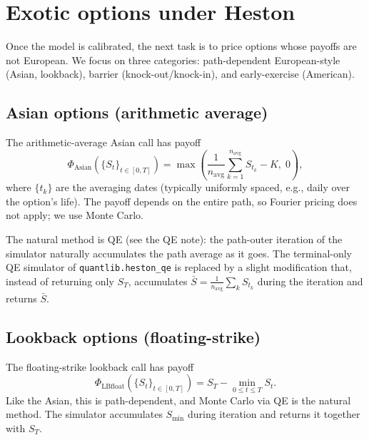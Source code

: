 \documentclass[11pt]{article}
\theoremstyle{plain}
\theoremstyle{definition}
\theoremstyle{remark}
\begin{document}
\section{Exotic options under Heston}

Once the model is calibrated, the next task is to price options whose payoffs are not European. We focus on three categories: path-dependent European-style (Asian, lookback), barrier (knock-out/knock-in), and early-exercise (American).

\subsection{Asian options (arithmetic average)}

The arithmetic-average Asian call has payoff
\begin{equation}
    \Phi_{\mathrm{Asian}}(\{S_t\}_{t \in [0, T]}) = \max\!\left(\frac{1}{n_{\mathrm{avg}}}\sum_{k=1}^{n_{\mathrm{avg}}} S_{t_k} - K,\; 0\right),                                                              \label{eq:asian-payoff}
\end{equation}
where $\{t_k\}$ are the averaging dates (typically uniformly spaced, e.g., daily over the option's life). The payoff depends on the entire path, so Fourier pricing does not apply; we use Monte Carlo.

The natural method is QE (see the QE note): the path-outer iteration of the simulator naturally accumulates the path average as it goes. The terminal-only QE simulator of \texttt{quantlib.heston\_qe} is replaced by a slight modification that, instead of returning only $S_T$, accumulates $\bar S = \tfrac{1}{n_{\mathrm{avg}}} \sum_k S_{t_k}$ during the iteration and returns $\bar S$.

\subsection{Lookback options (floating-strike)}

The floating-strike lookback call has payoff
\begin{equation}
    \Phi_{\mathrm{LBfloat}}(\{S_t\}_{t \in [0, T]}) = S_T - \min_{0 \leq t \leq T} S_t.                                                                                                                  \label{eq:lookback-payoff}
\end{equation}
Like the Asian, this is path-dependent, and Monte Carlo via QE is the natural method. The simulator accumulates $S_{\min}$ during iteration and returns it together with $S_T$.
\end{document}
